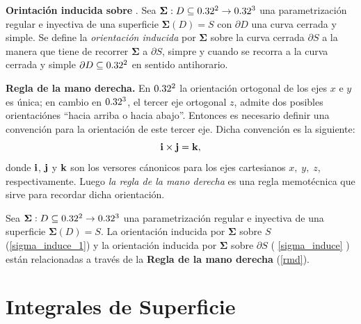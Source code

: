 \begin{definition} \label{sigma_induce} \textbf{Orintaci\'on inducida sobre} {}.   Sea $\boldsymbol{\Sigma}:D\subseteq0.32^2 \to0.32^3$ una parametrizaci\'on regular  e  inyectiva de una superficie $\boldsymbol{\Sigma}(D) = S$ con $ \partial D$ una curva cerrada y  simple.  Se define  la \emph{orientaci\'on inducida} por  $\boldsymbol{\Sigma}$  sobre  la curva cerrada $\partial S$ a la manera que tiene de recorrer  $\boldsymbol{\Sigma}$ a   $\partial S$,  simpre y cuando se recorra a la curva cerrada y simple $ \partial D \subseteq0.32^2$ en sentido antihorario.
\end{definition}

\begin{obs}\label{rmd}\textbf{Regla de la mano derecha.}  En $0.32^2$ la orientaci\'on ortogonal de los ejes $x$ e $y$ es \'unica; en cambio en $0.32^3$, el tercer eje ortogonal $z$, admite dos posibles 
    orientaci\'ones ``hacia arriba o hacia abajo''. Entonces es necesario definir una convenci\'on para la orientaci\'on de este tercer eje. Dicha convenci\'on es la siguiente: 
    \[
        \vect{i}\times\vect{j}=\vect{k},
    \]  
    donde $\vect{i}$, $\vect{j}$ y $\vect{k}$ son los versores c\'anonicos para los ejes cartesianos $x,\;y,\;z$, respectivamente. Luego \emph{la regla de la mano derecha} es una regla memot\'ecnica que sirve para recordar dicha orientaci\'on.
    
\end{obs}


\begin{obs}  Sea $\boldsymbol{\Sigma}:D\subseteq0.32^2 \to0.32^3$ una parametrizaci\'on regular  e  inyectiva de una superficie $\boldsymbol{\Sigma}(D) = S$.  La orientaci\'on inducida por $\boldsymbol{\Sigma}$ sobre $S$ (\ref{sigma_induce_1})  y   la orientación inducida por  $\boldsymbol{\Sigma}$  sobre $\partial S$  ( \ref{sigma_induce} ) est\'an relacionadas a trav\'es de la \textbf{Regla de la mano derecha} (\ref{rmd}).
 \end{obs}







 \section{Integrales de Superficie}

